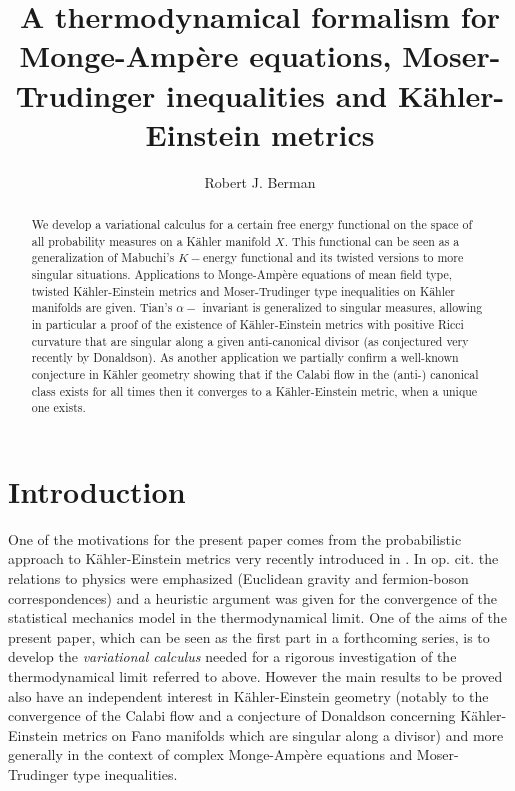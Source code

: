 \documentclass[11pt,oneside,english]{amsart}
\numberwithin{equation}{section}
\numberwithin{figure}{section}
\theoremstyle{plain}
\theoremstyle{plain}
\theoremstyle{plain}
\theoremstyle{plain}
\theoremstyle{remark}
\theoremstyle{definition}
\begin{document}
\title{A thermodynamical formalism for Monge-Ampère equations, Moser-Trudinger
inequalities and Kähler-Einstein metrics }

\author{Robert J. Berman}



\begin{abstract}
We develop a variational calculus for a certain free energy functional
on the space of all probability measures on a Kähler manifold $X$.
This functional can be seen as a generalization of Mabuchi's $K-$energy
functional and its twisted versions to more singular situations. Applications
to Monge-Ampère equations of mean field type, twisted Kähler-Einstein
metrics and Moser-Trudinger type inequalities on Kähler manifolds
are given. Tian's $\alpha-$ invariant is generalized to singular
measures, allowing in particular a proof of the existence of Kähler-Einstein
metrics with positive Ricci curvature that are singular along a given
anti-canonical divisor (as conjectured very recently by Donaldson).
As another application we partially confirm a well-known conjecture
in Kähler geometry showing that if the Calabi flow in the (anti-)
canonical class exists for all times then it converges to a Kähler-Einstein
metric, when a unique one exists. 

\tableofcontents{} 
\end{abstract}
\maketitle

\section{Introduction}

One of the motivations for the present paper comes from the probabilistic
approach to Kähler-Einstein metrics very recently introduced in \cite{b1}.
In op. cit. the relations to physics were emphasized (Euclidean gravity
and fermion-boson correspondences) and a heuristic argument was given
for the convergence of the statistical mechanics model in the thermodynamical
limit. One of the aims of the present paper, which can be seen as
the first part in a forthcoming series, is to develop the \emph{variational
calculus }needed for a rigorous investigation of the thermodynamical
limit referred to above. However the main results to be proved also
have an independent interest in Kähler-Einstein geometry (notably
to the convergence of the Calabi flow and a conjecture of Donaldson
concerning Kähler-Einstein metrics on Fano manifolds which are singular
along a divisor) and more generally in the context of complex Monge-Ampère
equations and Moser-Trudinger type inequalities.
\end{document}
